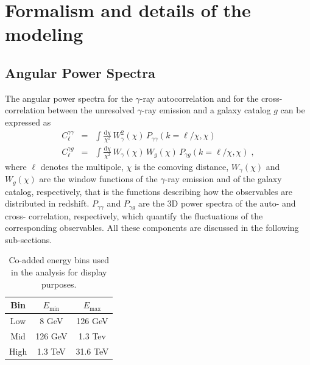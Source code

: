 \documentclass[aps,prd,a4paper,reprint,nofootinbib,superscriptaddress,floatfix,preprintnumbers]{revtex4-2}
\newcommand{\de}{\textrm{d}}
\begin{document}
\section{Formalism and details of the modeling}
\label{app:model}

\subsection{Angular Power Spectra}

The angular power spectra for the $\gamma$-ray autocorrelation and for the cross-correlation between the unresolved $\gamma$-ray emission and a galaxy catalog $g$ can be expressed as \cite{Camera:2012cj,Camera_2015,Fornengo:2013rga}
\begin{eqnarray}
    \label{eq:auto}
     C_\ell^{\gamma \gamma} &=& \int \frac{\de\chi}{\chi^2}\,W_{\gamma}^2(\chi)  
 \,P_{\gamma \gamma}\left(k=\ell/\chi,\chi\right) \\ 
     C_\ell^{\gamma g} &=&\int \frac{\de\chi}{\chi^2}\,W_{\gamma}(\chi)\, W_g(\chi)\,P_{\gamma g}\left(k=\ell/\chi,\chi\right) \; , \label{eq:cross}
 \end{eqnarray}
 where $\ell$ denotes the multipole, $\chi$ is the comoving distance, $W_{\gamma}(\chi)$ and $W_g(\chi)$ are the window functions of the $\gamma$-ray emission and of the galaxy catalog, respectively, that is the functions describing how the observables are distributed in redshift.  $P_{\gamma \gamma}$ and $P_{\gamma g}$ are the 3D power spectra of the auto- and cross- correlation, respectively, which quantify the fluctuations of the corresponding observables. All these components are discussed in the following sub-sections.


\begin{table}[t!]
\centering
\begin{tabular}{|c|cc|}
\hline
Bin & $E_\textrm{{min}}$ & $E_\textrm{{max}}$ \\
\hline
 Low & 8 GeV & 126 GeV \\  
 Mid & 126 GeV & 1.3 Tev \\
 High & 1.3 TeV & 31.6 TeV \\
\hline
  \end{tabular}
\caption{Co-added energy bins used in the analysis for display purposes.}
  \label{Tab:energybin}
\end{table}
\end{document}
